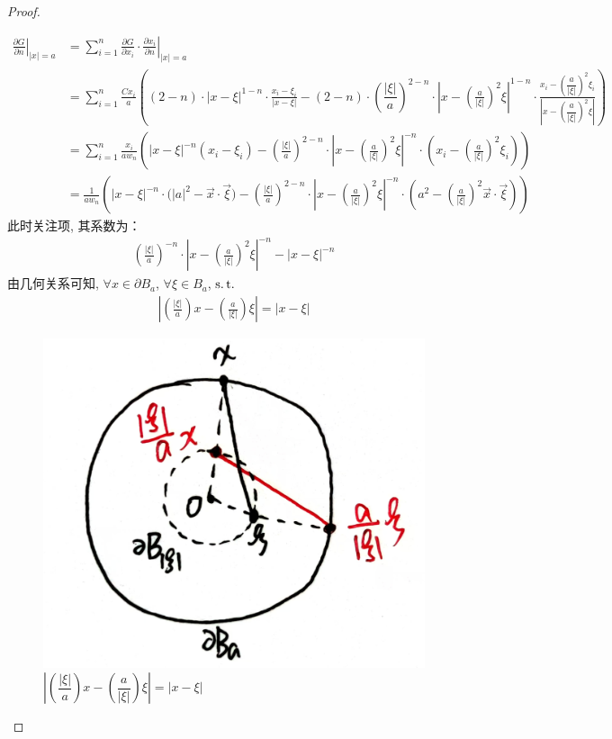 \begin{thm}
\begin{proof}
\begin{enumerate}
				\newpage
				
				\begin{align*}
					\left. \frac{\partial G}{\partial n} \right|_{| x | = a} 
					&= \sum_{i = 1}^n \frac{\partial G}{\partial x_i} \cdot \left. \frac{\partial x_i}{\partial n} \right|_{| x | = a} \\
					&= \sum_{i = 1}^n \frac{Cx_i}{a} 
					\left( (2 - n) \cdot |x - \xi|^{1 - n} \cdot \frac{x_i - \xi_i}{| x - \xi |} - (2 - n) \cdot \left( \dfrac{| \xi |}{a} \right)^{2 - n} \cdot  \left| x - \left( \frac{a}{| \xi |} \right)^2 \xi \right|^{1 - n} \cdot \frac{x_i - \left( \dfrac{a}{| \xi |} \right)^2 \xi_i}{\left| x - \left( \dfrac{a}{| \xi |} \right)^2 \xi \right|} \right) \\
					&= \sum_{i = 1}^n \frac{x_i}{a w_n} 
					\left( | x - \xi |^{-n} (x_i - \xi_i) - \left( \frac{| \xi |}{a} \right)^{2 - n} \cdot \left| x - \left( \frac{a}{| \xi |} \right)^2 \xi \right|^{-n} \cdot \left( x_i - \left( \frac{a}{| \xi |} \right)^2 \xi_i \right) \right) \\
					&= \frac{1}{a w_n} 
					\left( | x - \xi |^{-n} \cdot \Big( | a |^2 - \overrightarrow{x} \cdot \overrightarrow{\xi} \Big) - \left( \frac{| \xi |}{a} \right)^{2 - n} \cdot \left| x - \left( \frac{a}{| \xi |} \right)^2 \xi \right|^{-n} \cdot \left( a^2 - \left( \frac{a}{| \xi |} \right)^2 \overrightarrow{x} \cdot \overrightarrow{\xi} \right) \right)
				\end{align*}
				此时关注项, 其系数为：
				\begin{align*}
					\left( \frac{| \xi |}{a} \right)^{-n} \cdot \left| x - \left( \frac{a}{| \xi |} \right)^2 \xi \right|^{-n} - | x - \xi |^{-n}
				\end{align*}
				由几何关系可知, $\forall x \in \partial B_a$, $\forall \xi \in B_a$, $\operatorname{s.t.}$
				\begin{align*}
					 \left| \left( \frac{| \xi |}{a} \right) x - \left( \frac{a}{| \xi |} \right) \xi \right|  
					= | x - \xi |
				\end{align*}
				
				\begin{figure}[thbp!]
					\centering
					\includegraphics[width=0.27\linewidth]{figure/3.5-2}
					\caption{$\left| \left( \dfrac{| \xi |}{a} \right) x - \left( \dfrac{a}{| \xi |} \right) \xi \right| = | x - \xi |$}
					\label{pic : 3.5-2} %
				\end{figure}
				

\end{enumerate}
\end{proof}
\end{thm}
